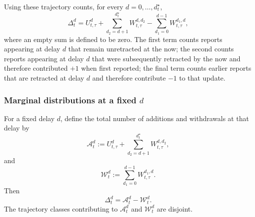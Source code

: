 \documentclass{article}
\theoremstyle{definition}
\theoremstyle{remark}
\begin{document}
Using these trajectory counts, for every $d=0,\dots,d_t^{\star}$,
\begin{equation}\label{deltadecomposition}
    \Delta_t^d
    =
    U_{t,\tau}^{d}
    +
    \sum_{d_2=d+1}^{d_t^{\star}}W_{t,\tau}^{d,d_2}
    -
    \sum_{d_1=0}^{d-1}W_{t,\tau}^{d_1,d},
\end{equation}
where an empty sum is defined to be zero. The first term counts reports appearing at delay $d$ that remain unretracted at the now; the second counts reports appearing at delay $d$ that were subsequently retracted by the now and therefore contributed $+1$ when first reported; the final term counts earlier reports that are retracted at delay $d$ and therefore contribute $-1$ to that update.

\subsubsection{Marginal distributions at a fixed $d$}

For a fixed delay $d$, define the total number of additions and withdrawals at that delay by
\begin{equation}\label{Adef}
    \mathcal A_t^d
    :=
    U_{t,\tau}^{d}
    +
    \sum_{d_2=d+1}^{d_t^{\star}}W_{t,\tau}^{d,d_2},
\end{equation}
and
\begin{equation}\label{withdrawalsdef}
    \mathcal W_t^d
    :=
    \sum_{d_1=0}^{d-1}W_{t,\tau}^{d_1,d}.
\end{equation}
Then
\begin{equation}\label{deltaAB}
    \Delta_t^d=\mathcal A_t^d-\mathcal W_t^d.
\end{equation}
The trajectory classes contributing to $\mathcal A_t^d$ and $\mathcal W_t^d$ are disjoint.
\end{document}
